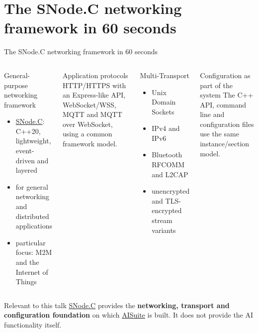 \documentclass[\fhformat,10pt]{fh-ooe}
\newcommand{\SNodeCLink}{\href{https://github.com/SNodeC/snode.c}{SNode.C}}
\newcommand{\AISuiteLink}{\href{https://github.com/SNodeC/AISuite}{AISuite}}
\begin{document}
\section{The SNode.C networking framework in 60 seconds}
\begin{frame}{The SNode.C networking framework in 60 seconds}
\small
\begin{columns}[T]
\begin{block}{General-purpose networking framework}
\begin{itemize}
  \item \SNodeCLink: C++20, lightweight, event-driven and layered
  \item for general networking and distributed applications
  \item particular focus: M2M and the Internet of Things
\end{itemize}
\end{block}
\begin{block}{Application protocols}
HTTP/HTTPS with an Express-like API, WebSocket/WSS, MQTT and MQTT over WebSocket, using a common framework model.
\end{block}
\begin{block}{Multi-Transport}
\begin{itemize}
  \item Unix Domain Sockets
  \item IPv4 and IPv6
  \item Bluetooth RFCOMM and L2CAP
  \item unencrypted and TLS-encrypted stream variants
\end{itemize}
\end{block}
\begin{block}{Configuration as part of the system}
The C++ API, command line and configuration files use the same instance/section model.
\end{block}
\end{columns}
\vspace{0.15em}
\begin{alertblock}{Relevant to this talk}
\SNodeCLink{} provides the \textbf{networking, transport and configuration foundation} on which \AISuiteLink{} is built. It does not provide the AI functionality itself.
\end{alertblock}
\end{frame}

\end{document}
